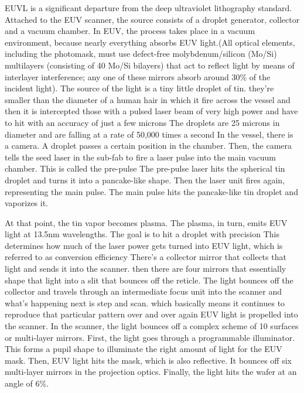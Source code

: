 \documentclass[12pt,a4paper]{report}
\begin{document}
EUVL is a significant departure from the deep 
ultraviolet lithography standard. 
Attached to the EUV scanner, the source consists 
of a droplet generator, collector and a vacuum chamber. 
In EUV, the process takes place in a vacuum 
environment, because nearly everything absorbs 
EUV light.(All optical elements, including the photomask,
 must use defect-free molybdenum/silicon (Mo/Si) 
 multilayers (consisting of 40 Mo/Si bilayers) that 
act to reflect light by means of interlayer 
interference; any one of these mirrors absorb
 around 30\% 
of the incident light). The source of the light is a tiny little droplet of tin.
they're smaller than 
the diameter of a human hair in which it fire 
across the vessel and then it is intercepted those 
with a pulsed laser 
beam of very high power and have to hit with 
an accuracy of just a few microns
The droplets are 25 microns in diameter and 
are falling at a rate of 50,000 times a second
In the vessel, there is a camera. A droplet 
passes a certain position in the chamber. 
Then, the camera tells the seed laser in the 
sub-fab to fire a laser pulse into the main 
vacuum chamber. This is called the pre-pulse
The pre-pulse laser hits the spherical tin droplet 
and turns it into a pancake-like shape. Then the laser 
unit fires again, representing the main pulse. 
The main pulse hits the pancake-like tin droplet
 and vaporizes it.


At that point, the tin vapor becomes plasma. 
The plasma, in turn, emits EUV light at 13.5nm 
wavelengths. The goal is to hit a droplet with precision
This determines how much of the laser power 
gets turned into EUV light, 
which is referred to as conversion efficiency
There's a collector mirror that collects that light
and sends it into the scanner. then there are 
four mirrors that essentially shape that light 
into a slit that bounces off the reticle.
The light bounces off the collector and travels 
through an intermediate focus unit into the scanner
and what's happening next is step and scan. which 
basically means it continues to reproduce that 
particular pattern over and over again
EUV light is propelled into the scanner. In the 
scanner, the light bounces off a complex scheme 
of 10 surfaces or multi-layer mirrors. First, 
the light goes through a programmable illuminator. 
This forms a pupil shape to illuminate the right 
amount of light for the EUV mask.
Then, EUV light hits the mask, which is also 
reflective. It bounces off six multi-layer 
mirrors in the projection optics. Finally, 
the light hits the wafer at an angle of 6\%.
\end{document}

